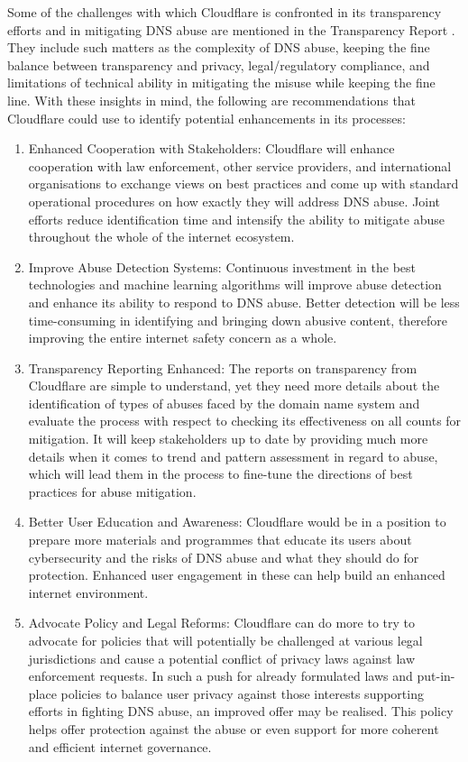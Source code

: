 \begin{enumerate}
\begin{enumerate}
\end{enumerate}

Some of the challenges with which Cloudflare is confronted in its transparency efforts and in mitigating DNS abuse are mentioned in the Transparency Report . They include such matters as the complexity of DNS abuse, keeping the fine balance between transparency and privacy, legal/regulatory compliance, and limitations of technical ability in mitigating the misuse while keeping the fine line. With these insights in mind, the following are recommendations that Cloudflare could use to identify potential enhancements in its processes:

\begin{enumerate}
    \item Enhanced Cooperation with Stakeholders: Cloudflare will enhance cooperation with law enforcement, other service providers, and international organisations to exchange views on best practices and come up with standard operational procedures on how exactly they will address DNS abuse. Joint efforts reduce identification time and intensify the ability to mitigate abuse throughout the whole of the internet ecosystem.
    \item Improve Abuse Detection Systems: Continuous investment in the best technologies and machine learning algorithms will improve abuse detection and enhance its ability to respond to DNS abuse. Better detection will be less time-consuming in identifying and bringing down abusive content, therefore improving the entire internet safety concern as a whole.
    \item Transparency Reporting Enhanced: The reports on transparency from Cloudflare are simple to understand, yet they need more details about the identification of types of abuses faced by the domain name system and evaluate the process with respect to checking its effectiveness on all counts for mitigation. It will keep stakeholders up to date by providing much more details when it comes to trend and pattern assessment in regard to abuse, which will lead them in the process to fine-tune the directions of best practices for abuse mitigation.
    \item Better User Education and Awareness: Cloudflare would be in a position to prepare more materials and programmes that educate its users about cybersecurity and the risks of DNS abuse and what they should do for protection. Enhanced user engagement in these can help build an enhanced internet environment.
    \item Advocate Policy and Legal Reforms: Cloudflare can do more to try to advocate for policies that will potentially be challenged at various legal jurisdictions and cause a potential conflict of privacy laws against law enforcement requests. In such a push for already formulated laws and put-in-place policies to balance user privacy against those interests supporting efforts in fighting DNS abuse, an improved offer may be realised. This policy helps offer protection against the abuse or even support for more coherent and efficient internet governance.

\end{enumerate}
\end{enumerate}
